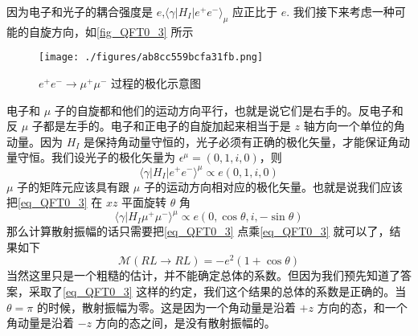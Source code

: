 因为电子和光子的耦合强度是 $e$,$\langle \gamma | H_I | e^+ e^- \rangle_\mu$ 应正比于 $e$. 我们接下来考虑一种可能的自旋方向，如\autoref{fig_QFT0_3} 所示
\begin{figure}[ht]
\centering
\texttt{[image: ./figures/ab8cc559bcfa31fb.png]}
\caption{$e^+e^-\rightarrow\mu^+\mu^-$ 过程的极化示意图} \label{fig_QFT0_3}
\end{figure}
电子和 $\mu$ 子的自旋都和他们的运动方向平行，也就是说它们是右手的。反电子和反 $\mu$ 子都是左手的。电子和正电子的自旋加起来相当于是 $z$ 轴方向一个单位的角动量。因为 $H_I$ 是保持角动量守恒的，光子必须有正确的极化矢量，才能保证角动量守恒。我们设光子的极化矢量为 $\epsilon^\mu =(0,1,i,0)$，则
\begin{equation}
\langle \gamma | H_I | e^+ e^- \rangle^\mu \propto e (0,1,i ,0)
\end{equation}
$\mu$ 子的矩阵元应该具有跟 $\mu$ 子的运动方向相对应的极化矢量。也就是说我们应该把\autoref{eq_QFT0_3} 在 $xz$ 平面旋转 $\theta$ 角
\begin{equation}
\langle \gamma| H_I \mu^+\mu^-\rangle^\mu \propto e (0,\cos\theta, i, - \sin\theta) 
\end{equation}
那么计算散射振幅的话只需要把\autoref{eq_QFT0_3} 点乘\autoref{eq_QFT0_3} 就可以了，结果如下
\begin{equation}
\mathcal M(RL\rightarrow RL) = - e^2 (1+\cos\theta)
\end{equation}
当然这里只是一个粗糙的估计，并不能确定总体的系数。但因为我们预先知道了答案，采取了\autoref{eq_QFT0_3} 这样的约定，我们这个结果的总体的系数是正确的。当 $\theta = \pi$ 的时候，散射振幅为零。这是因为一个角动量是沿着 $+z$ 方向的态，和一个角动量是沿着 $-z$ 方向的态之间，是没有散射振幅的。

